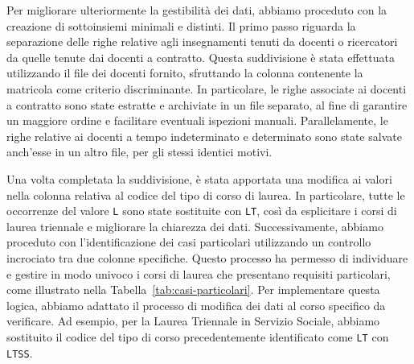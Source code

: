 Per migliorare ulteriormente la gestibilità dei dati, abbiamo proceduto con la creazione 
di sottoinsiemi minimali e distinti. Il primo passo riguarda la separazione delle 
righe relative agli insegnamenti tenuti da docenti o ricercatori da quelle tenute dai 
docenti a contratto. Questa suddivisione è stata effettuata utilizzando il file dei docenti fornito, 
sfruttando la colonna contenente la matricola come criterio discriminante. In particolare, 
le righe associate ai docenti a contratto sono state estratte e archiviate in un file separato, 
al fine di garantire un maggiore ordine e facilitare eventuali ispezioni manuali. 
Parallelamente, le righe relative ai docenti a tempo indeterminato e determinato sono 
state salvate anch'esse in un altro file, per gli stessi identici motivi.

Una volta completata la suddivisione, è stata apportata una modifica ai valori nella colonna 
relativa al codice del tipo di corso di laurea. In particolare, tutte le occorrenze del 
valore \texttt{L} sono state sostituite con \texttt{LT}, così da esplicitare i corsi di 
laurea triennale e migliorare la chiarezza dei dati. Successivamente, abbiamo proceduto con 
l'identificazione dei casi particolari utilizzando un controllo incrociato tra due colonne 
specifiche. Questo processo ha permesso di individuare e gestire in modo univoco i corsi 
di laurea che presentano requisiti particolari, come illustrato nella 
Tabella~\ref{tab:casi-particolari}.
Per implementare questa logica, abbiamo adattato il processo di modifica dei dati al corso 
specifico da verificare. Ad esempio, per la Laurea Triennale in Servizio Sociale, abbiamo 
sostituito il codice del tipo di corso precedentemente identificato come \texttt{LT} con 
\texttt{LTSS}.


